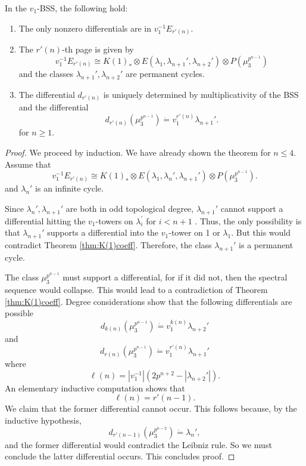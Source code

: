 \begin{thm}\label{key to proof 2}
	In the $v_1$-BSS, the following hold: 
	\begin{enumerate}
		\item The only nonzero differentials are in $v_1^{-1}E_{r'(n)}$. 
		\item The $r'(n)$-th page is given by 
		\[
		v_1^{-1}E_{r'(n)} \cong K(1)_*\otimes E(\lambda_1, \lambda_{n+1}', \lambda_{n+2}')\otimes P(\mu_3^{p^{n-1}})
		\]
		and the classes $\lambda_{n+1}', \lambda_{n+2}'$ are permanent cycles. 
		\item The differential $d_{r'(n)}$ is uniquely determined by multiplicativity of the BSS and the differential
		\[
		d_{r'(n)}(\mu_3^{p^{n-1}})\dot{=}v_1^{r'(n)}\lambda_{n+1}'.
		\]
		for $n\ge 1$.
	\end{enumerate}
\end{thm}
\begin{proof}
	We proceed by induction. We have already shown the theorem for $n\leq 4$. Assume that 
	\[
	v_1^{-1}E_{r'(n)}\cong K(1)_*\otimes E(\lambda_1, \lambda_n', \lambda_{n+1}')\otimes P(\mu_3^{p^{n-1}}).
	\]
	and $\lambda_n'$ is an infinite cycle.  
	
	Since $\lambda_n', \lambda_{n+1}'$ are both in odd topological degree, $\lambda_{n+1}'$ cannot support a differential hitting the $v_1$-towers on $\lambda_i^{\prime}$ for $i<n+1$ . Thus, the only possibility is that $\lambda_{n+1}'$ supports a differential into the $v_1$-tower on 1 or $\lambda_1$. But this would contradict Theorem \ref{thm:K(1)coeff}. Therefore, the class $\lambda_{n+1}'$ is a permanent cycle. 
	
	The class $\mu_3^{p^{n-1}}$ must support a differential, for if it did not, then the spectral sequence would collapse. This would lead to a contradiction of Theorem \ref{thm:K(1)coeff}. Degree considerations show that the following differentials are possible
	\[
	d_{k(n)}(\mu_3^{p^{n-1}})\dot{=}v_1^{k(n)}\lambda_{n+2}'
	\]
	and 
	\[
	d_{r(n)}(\mu_3^{p^{n-1}})\dot{=}v_1^{r'(n)}\lambda_{n+1}'
	\]
	where
	\[
	\ell(n) = |v_1^{-1}|(2p^{n+2}-|\lambda_{n+2}'|).
	\]
	An elementary inductive computation shows that 
	\[
	\ell(n) = r'(n-1).
	\]
	We claim that the former differential cannot occur. This follows because, by the inductive hypothesis, 
	\[
	d_{r'(n-1)} (\mu_3^{p^{n-2}})\dot{=}\lambda_{n}', 
	\]
	and the former differential would contradict the Leibniz rule. So we must conclude the latter differential occurs. This concludes proof.
\end{proof}

